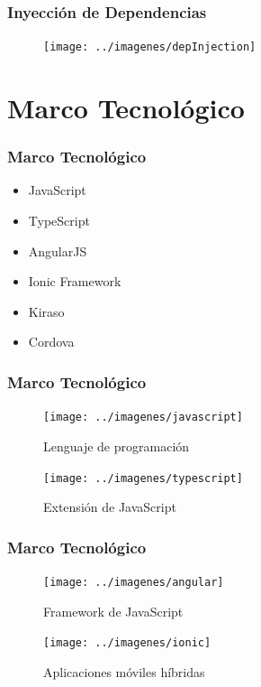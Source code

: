 \documentclass{beamer}
\begin{document}



\begin{frame}[fragile]
\frametitle{Inyección de Dependencias}

\begin{figure}[H]
  \centering
  \texttt{[image: ../imagenes/depInjection]}
\end{figure}

\end{frame}


\section{Marco Tecnológico}

\begin{frame}[fragile]
\frametitle{Marco Tecnológico}
\begin{itemize}
	\item JavaScript
	\item TypeScript
	\item AngularJS
	\item Ionic Framework
	\item Kiraso
	\item Cordova
\end{itemize}

\end{frame}

\begin{frame}[fragile]
\frametitle{Marco Tecnológico}

\begin{figure}[H]
  \texttt{[image: ../imagenes/javascript]}
  \caption*{Lenguaje de programación}
\end{figure}

\begin{figure}[H]
  \texttt{[image: ../imagenes/typescript]}
  \caption*{Extensión de JavaScript}
\end{figure}


\end{frame}

\begin{frame}[fragile]
\frametitle{Marco Tecnológico}

\begin{figure}[H]
  \texttt{[image: ../imagenes/angular]}
  \caption*{Framework de JavaScript}
\end{figure}

\begin{figure}[H]
  \texttt{[image: ../imagenes/ionic]}
  \caption*{Aplicaciones móviles híbridas}
\end{figure}


\end{frame}
\end{document}

